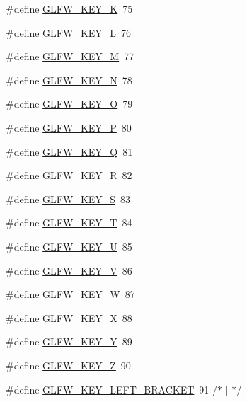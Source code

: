 \begin{DoxyCompactItemize}
\item 
\#define \hyperlink{group__keys_ga4ae8debadf6d2a691badae0b53ea3ba0}{G\-L\-F\-W\-\_\-\-K\-E\-Y\-\_\-\-K}~75
\item 
\#define \hyperlink{group__keys_gaaa8b54a13f6b1eed85ac86f82d550db2}{G\-L\-F\-W\-\_\-\-K\-E\-Y\-\_\-\-L}~76
\item 
\#define \hyperlink{group__keys_ga4d7f0260c82e4ea3d6ebc7a21d6e3716}{G\-L\-F\-W\-\_\-\-K\-E\-Y\-\_\-\-M}~77
\item 
\#define \hyperlink{group__keys_gae00856dfeb5d13aafebf59d44de5cdda}{G\-L\-F\-W\-\_\-\-K\-E\-Y\-\_\-\-N}~78
\item 
\#define \hyperlink{group__keys_gaecbbb79130df419d58dd7f09a169efe9}{G\-L\-F\-W\-\_\-\-K\-E\-Y\-\_\-\-O}~79
\item 
\#define \hyperlink{group__keys_ga8fc15819c1094fb2afa01d84546b33e1}{G\-L\-F\-W\-\_\-\-K\-E\-Y\-\_\-\-P}~80
\item 
\#define \hyperlink{group__keys_gafdd01e38b120d67cf51e348bb47f3964}{G\-L\-F\-W\-\_\-\-K\-E\-Y\-\_\-\-Q}~81
\item 
\#define \hyperlink{group__keys_ga4ce6c70a0c98c50b3fe4ab9a728d4d36}{G\-L\-F\-W\-\_\-\-K\-E\-Y\-\_\-\-R}~82
\item 
\#define \hyperlink{group__keys_ga1570e2ccaab036ea82bed66fc1dab2a9}{G\-L\-F\-W\-\_\-\-K\-E\-Y\-\_\-\-S}~83
\item 
\#define \hyperlink{group__keys_ga90e0560422ec7a30e7f3f375bc9f37f9}{G\-L\-F\-W\-\_\-\-K\-E\-Y\-\_\-\-T}~84
\item 
\#define \hyperlink{group__keys_gacad52f3bf7d378fc0ffa72a76769256d}{G\-L\-F\-W\-\_\-\-K\-E\-Y\-\_\-\-U}~85
\item 
\#define \hyperlink{group__keys_ga22c7763899ecf7788862e5f90eacce6b}{G\-L\-F\-W\-\_\-\-K\-E\-Y\-\_\-\-V}~86
\item 
\#define \hyperlink{group__keys_gaa06a712e6202661fc03da5bdb7b6e545}{G\-L\-F\-W\-\_\-\-K\-E\-Y\-\_\-\-W}~87
\item 
\#define \hyperlink{group__keys_gac1c42c0bf4192cea713c55598b06b744}{G\-L\-F\-W\-\_\-\-K\-E\-Y\-\_\-\-X}~88
\item 
\#define \hyperlink{group__keys_gafd9f115a549effdf8e372a787c360313}{G\-L\-F\-W\-\_\-\-K\-E\-Y\-\_\-\-Y}~89
\item 
\#define \hyperlink{group__keys_gac489e208c26afda8d4938ed88718760a}{G\-L\-F\-W\-\_\-\-K\-E\-Y\-\_\-\-Z}~90
\item 
\#define \hyperlink{group__keys_gad1c8d9adac53925276ecb1d592511d8a}{G\-L\-F\-W\-\_\-\-K\-E\-Y\-\_\-\-L\-E\-F\-T\-\_\-\-B\-R\-A\-C\-K\-E\-T}~91  /$\ast$ \mbox{[} $\ast$/

\end{DoxyCompactItemize}
